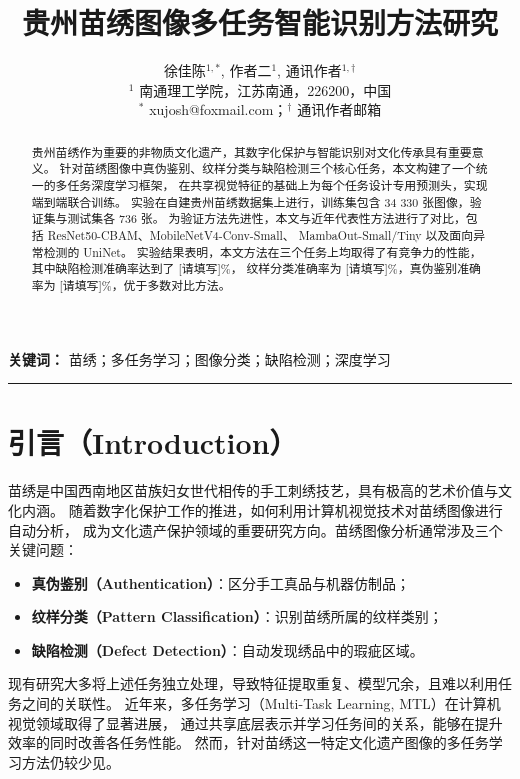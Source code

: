 \documentclass[12pt,a4paper]{article}
\title{\textbf{贵州苗绣图像多任务智能识别方法研究}}
\author{
    徐佳陈$^{1,*}$, \quad
    作者二$^{1}$, \quad
    通讯作者$^{1,\dagger}$ \\[0.5em]
    \small $^{1}$ 南通理工学院，江苏南通，226200，中国 \\
    \small $^{*}$ xujosh@foxmail.com；$^{\dagger}$ 通讯作者邮箱
}
\date{}
\begin{document}
\maketitle

\begin{abstract}
贵州苗绣作为重要的非物质文化遗产，其数字化保护与智能识别对文化传承具有重要意义。
针对苗绣图像中真伪鉴别、纹样分类与缺陷检测三个核心任务，本文构建了一个统一的多任务深度学习框架，
在共享视觉特征的基础上为每个任务设计专用预测头，实现端到端联合训练。
实验在自建贵州苗绣数据集上进行，训练集包含 34 330 张图像，验证集与测试集各 736 张。
为验证方法先进性，本文与近年代表性方法进行了对比，包括 ResNet50-CBAM、MobileNetV4-Conv-Small、
MambaOut-Small/Tiny 以及面向异常检测的 UniNet。
实验结果表明，本文方法在三个任务上均取得了有竞争力的性能，其中缺陷检测准确率达到了 [请填写]\%，
纹样分类准确率为 [请填写]\%，真伪鉴别准确率为 [请填写]\%，优于多数对比方法。
\end{abstract}

\noindent\textbf{关键词：} 苗绣；多任务学习；图像分类；缺陷检测；深度学习

\vspace{1em}
\noindent\rule{\textwidth}{0.4pt}

\section{引言（Introduction）}

苗绣是中国西南地区苗族妇女世代相传的手工刺绣技艺，具有极高的艺术价值与文化内涵。
随着数字化保护工作的推进，如何利用计算机视觉技术对苗绣图像进行自动分析，
成为文化遗产保护领域的重要研究方向。苗绣图像分析通常涉及三个关键问题：
\begin{itemize}
    \item \textbf{真伪鉴别（Authentication）}：区分手工真品与机器仿制品；
    \item \textbf{纹样分类（Pattern Classification）}：识别苗绣所属的纹样类别；
    \item \textbf{缺陷检测（Defect Detection）}：自动发现绣品中的瑕疵区域。
\end{itemize}

现有研究大多将上述任务独立处理，导致特征提取重复、模型冗余，且难以利用任务之间的关联性。
近年来，多任务学习（Multi-Task Learning, MTL）在计算机视觉领域取得了显著进展，
通过共享底层表示并学习任务间的关系，能够在提升效率的同时改善各任务性能\cite{caruana1997multitask}。
然而，针对苗绣这一特定文化遗产图像的多任务学习方法仍较少见。
\end{document}
